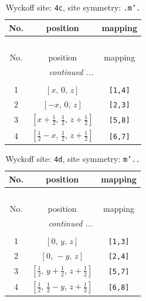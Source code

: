 \documentclass[fleqn,8pt]{jsarticle}
\begin{document}
\renewcommand{\arraystretch}{1.2}
\begin{longtable}{ccc}
\caption{Wyckoff site: {\tt 4c}, site symmetry: {\tt .m'.}}
 \\
 \hline \hline
No. & position & mapping \\ \hline \endfirsthead

\multicolumn{2}{l}{\tablename\ \thetable{}} \\
 \hline \hline
No. & position & mapping \\ \hline \endhead

 \hline \hline
\multicolumn{2}{r}{\footnotesize\it continued ...} \\ \endfoot

 \hline \hline
\multicolumn{2}{r}{} \\ \endlastfoot

1 & $\left[ x,\, 0,\, z \right]$ & {\tt [1,4]} \\ \hline
2 & $\left[ - x,\, 0,\, z \right]$ & {\tt [2,3]} \\ \hline
3 & $\left[ x + \frac{1}{2},\, \frac{1}{2},\, z + \frac{1}{2} \right]$ & {\tt [5,8]} \\ \hline
4 & $\left[ \frac{1}{2} - x,\, \frac{1}{2},\, z + \frac{1}{2} \right]$ & {\tt [6,7]} \\
\end{longtable}
\renewcommand{\arraystretch}{1.2}
\begin{longtable}{ccc}
\caption{Wyckoff site: {\tt 4d}, site symmetry: {\tt m'..}}
 \\
 \hline \hline
No. & position & mapping \\ \hline \endfirsthead

\multicolumn{2}{l}{\tablename\ \thetable{}} \\
 \hline \hline
No. & position & mapping \\ \hline \endhead

 \hline \hline
\multicolumn{2}{r}{\footnotesize\it continued ...} \\ \endfoot

 \hline \hline
\multicolumn{2}{r}{} \\ \endlastfoot

1 & $\left[ 0,\, y,\, z \right]$ & {\tt [1,3]} \\ \hline
2 & $\left[ 0,\, - y,\, z \right]$ & {\tt [2,4]} \\ \hline
3 & $\left[ \frac{1}{2},\, y + \frac{1}{2},\, z + \frac{1}{2} \right]$ & {\tt [5,7]} \\ \hline
4 & $\left[ \frac{1}{2},\, \frac{1}{2} - y,\, z + \frac{1}{2} \right]$ & {\tt [6,8]} \\
\end{longtable}
\end{document}

